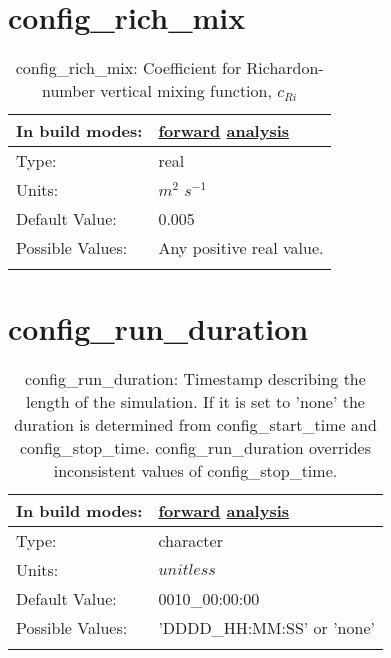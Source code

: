 \section[config\_rich\_mix]{config\_rich\_mix}
\label{sec:nm_sec_config_rich_mix}
\begin{center}
\begin{longtable}{| p{2.0in} || p{4.0in} |}
    \hline
    In build modes: & \hyperref[subsec:forward_nm_tab_vmix_rich]{forward} \hyperref[subsec:analysis_nm_tab_vmix_rich]{analysis} \\
    \hline
    Type: & real \\
    \hline
    Units: & $m^2$ $s^{-1}$ \\
    \hline
    Default Value: & 0.005 \\
    \hline
    Possible Values: & Any positive real value. \\
    \hline
    \caption{config\_rich\_mix:  Coefficient for Richardon-number vertical mixing function,  $c_{Ri}$ }
\end{longtable}
\end{center}
\section[config\_run\_duration]{config\_run\_duration}
\label{sec:nm_sec_config_run_duration}
\begin{center}
\begin{longtable}{| p{2.0in} || p{4.0in} |}
    \hline
    In build modes: & \hyperref[subsec:forward_nm_tab_time_management]{forward} \hyperref[subsec:analysis_nm_tab_time_management]{analysis} \\
    \hline
    Type: & character \\
    \hline
    Units: & $unitless$ \\
    \hline
    Default Value: & 0010\_00:00:00 \\
    \hline
    Possible Values: & 'DDDD\_HH:MM:SS' or 'none' \\
    \hline
    \caption{config\_run\_duration: Timestamp describing the length of the simulation. If it is set to 'none' the duration is determined from config\_start\_time and config\_stop\_time. config\_run\_duration overrides inconsistent values of config\_stop\_time.}
\end{longtable}
\end{center}
